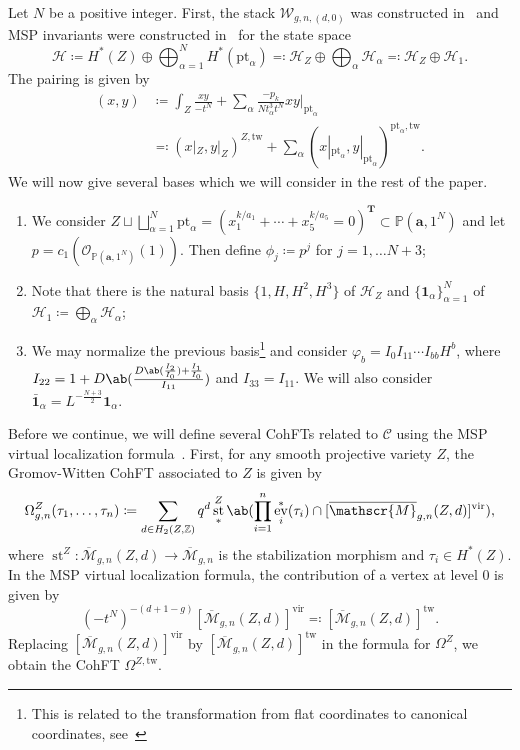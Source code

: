 \documentclass[10pt]{amsart}
\theoremstyle{definition}
\theoremstyle{remark}
\theoremstyle{plain}
\theoremstyle{definition}
\theoremstyle{remark}
\newcommand{\Z}{\mathbb{Z}}
\newcommand{\ba}{\mathbf{a}}
\renewcommand{\P}{\mathbb{P}}
\newcommand{\mc}[1]{\mathcal{#1}}
\newcommand{\msc}[1]{\mathscr{#1}}
\newcommand{\T}{\mathbf{T}}
\newcommand{\mr}[1]{\mathrm{#1}}
\newcommand{\ol}[1]{\overline{#1}}
\newcommand{\1}{\mathbf{1}}
\newcommand{\2}{\mathbf{2}}
\newcommand{\3}{\mathbf{3}}
\newcommand{\vir}{\mr{vir}}
\newcommand{\pt}{\mr{pt}}
\newcommand{\tw}{\mr{tw}}
\DeclareMathOperator{\ev}{ev}
\DeclareMathOperator{\st}{st}
\numberwithin{equation}{section}
\begin{document}
Let $N$ be a positive integer. First, the stack $\msc{W}_{g,n,(d,0)}$ was constructed in~\cite{foundations} and MSP invariants were constructed in~\cite{polynomiality} for the state space 
\[ \msc{H} \coloneqq H^*(Z) \oplus \bigoplus_{\alpha=1}^N H^*(\pt_{\alpha}) \eqqcolon \msc{H}_Z \oplus \bigoplus_{\alpha}\msc{H}_{\alpha} \eqqcolon \msc{H}_Z \oplus \msc{H}_1. \]
The pairing is given by 
\begin{align*}
    (x,y) &\coloneqq  \int_{Z} \frac{xy}{-t^N} + \sum_{\alpha} \frac{-p_k}{N t_{\alpha}^3 t^N} xy \bigg\vert_{\pt_{\alpha}}\\
    &\eqqcolon (x|_{Z},y|_{Z})^{Z, \tw} + \sum_{\alpha} (x|_{\pt_{\alpha}}, y|_{\pt_{\alpha}})^{\pt_{\alpha}, \tw}.
\end{align*}
We will now give several bases which we will consider in the rest of the paper.
\begin{enumerate}
    \item We consider $Z \sqcup \bigsqcup_{\alpha=1}^N \pt_{\alpha} = (x_1^{k/a_1} + \cdots + x_5^{k/a_5} = 0)^{\T} \subset \P(\ba, 1^N)$ and let $p = c_1(\mc{O}_{\P(\ba, 1^N)}(1))$. Then define $\phi_j \coloneqq p^j$ for $j = 1, \ldots N+3$;
    \item Note that there is the natural basis $\{1,H,H^2, H^3\}$ of $\msc{H}_Z$ and $\{\1_{\alpha}\}_{\alpha=1}^N$ of $\msc{H}_1 \coloneqq \bigoplus_{\alpha} \msc{H}_{\alpha}$;
    \item We may normalize the previous basis\footnote{This is related to the transformation from flat coordinates to canonical coordinates, see~\cite[\S 5]{polynomiality}} and consider $\varphi_b = I_0 I_{11} \cdots I_{bb} H^b$, where $I_{22} = 1 + D\ab(\frac{D \ab(\frac{I_2}{I_0})+\frac{I_1}{I_0}}{I_{11}})$ and $I_{33} = I_{11}$. We will also consider $\bar{\1}_{\alpha} = L^{-\frac{N+3}{2}}\1_{\alpha}$.
\end{enumerate}

Before we continue, we will define several CohFTs related to $\mc{C}$ using the MSP virtual localization formula~\cite[\S 6]{foundations}. First, for any smooth projective variety $Z$, the Gromov-Witten CohFT associated to $Z$ is given by
\[ \Omega_{g,n}^Z(\tau_1, \ldots, \tau_n) \coloneqq \sum_{d \in H_2(Z,\Z)} q^d \st^Z_* \ab(\prod_{i=1}^n \ev_i^*(\tau_i) \cap [\ol{\msc{M}}_{g,n}(Z,d)]^{\vir}), \]
where $\st^Z \colon \ol{\msc{M}}_{g,n}(Z,d) \to \ol{\msc{M}}_{g,n}$ is the stabilization morphism and $\tau_i \in H^*(Z)$. In the MSP virtual localization formula, the contribution of a vertex at level $0$ is given by
\[ (-t^N)^{-(d+1-g)} [\ol{\msc{M}}_{g,n}(Z,d)]^{\vir} \eqqcolon [\ol{\msc{M}}_{g,n}(Z,d)]^{\tw}. \]
Replacing $[\ol{\msc{M}}_{g,n}(Z,d)]^{\vir}$ by $[\ol{\msc{M}}_{g,n}(Z,d)]^{\tw}$ in the formula for $\Omega^Z$, we obtain the CohFT $\Omega^{Z,\tw}$.
\end{document}
